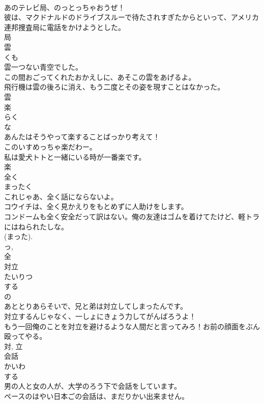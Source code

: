 \documentclass[8pt]{extreport}
\begin{document}
\begin{CJK}{UTF8}{min}
\\	あのテレビ局、のっとっちゃおうぜ！	
\\	彼は、マクドナルドのドライブスルーで待たされすぎたからといって、アメリカ連邦捜査局に電話をかけようとした。	
\\	局	
\\	雲	
\\	くも	
\\	雲一つない青空でした。	
\\	この間おごってくれたおかえしに、あそこの雲をあげるよ。	
\\	飛行機は雲の後ろに消え、もう二度とその姿を現すことはなかった。	
\\	雲	
\\	楽	
\\	らく	
\\	な 
\\	あんたはそうやって楽することばっかり考えて！	
\\	このいすめっちゃ楽だわー。	
\\	私は愛犬トトと一緒にいる時が一番楽です。	
\\	楽	
\\	全く	
\\	まったく	
\\	これじゃあ、全く話にならないよ。	
\\	コウイチは、全く見かえりをもとめずに人助けをします。	
\\	コンドームも全く安全だって訳はない。俺の友達はゴムを着けてたけど、軽トラにはねられたしな。	
\\	(まった). 
\\	っ, 
\\	全	
\\	対立	
\\	たいりつ	
\\	する 
\\	の 
\\	あととりあらそいで、兄と弟は対立してしまったんです。	
\\	対立するんじゃなく、一しょにきょう力してがんばろうよ！	
\\	もう一回俺のことを対立を避けるような人間だと言ってみろ！お前の顔面をぶん殴ってやる。	
\\	対, 立	
\\	会話	
\\	かいわ	
\\	する 
\\	男の人と女の人が、大学のろう下で会話をしています。	
\\	ペースのはやい日本ごの会話は、まだりかい出来ません。	

\end{CJK}
\end{document}
